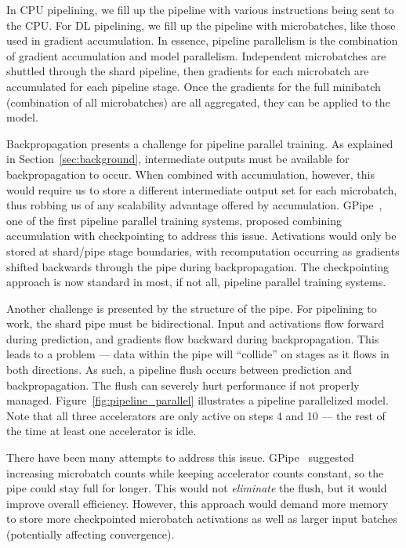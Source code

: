 In CPU pipelining, we fill up the pipeline with various instructions being sent to the CPU. For DL pipelining, we fill up the pipeline with microbatches, like those used in gradient accumulation. In essence, pipeline parallelism is the combination of gradient accumulation and model parallelism. Independent microbatches are shuttled through the shard pipeline, then gradients for each microbatch are accumulated for each pipeline stage. Once the gradients for the full minibatch (combination of all microbatches) are all aggregated, they can be applied to the model.

Backpropagation presents a challenge for pipeline parallel training. As explained in Section~\ref{sec:background}, intermediate outputs must be available for backpropagation to occur. When combined with accumulation, however, this would require us to store a different intermediate output set for each microbatch, thus robbing us of any scalability advantage offered by accumulation. GPipe~\cite{gpipe2019}, one of the first pipeline parallel training systems, proposed combining accumulation with checkpointing to address this issue. Activations would only be stored at shard/pipe stage boundaries, with recomputation occurring as gradients shifted backwards through the pipe during backpropagation. The checkpointing approach is now standard in most, if not all, pipeline parallel training systems.

Another challenge is presented by the structure of the pipe. For pipelining to work, the shard pipe must be bidirectional. Input and activations flow forward during prediction, and gradients flow backward during backpropagation. This leads to a problem --- data within the pipe will ``collide'' on stages as it flows in both directions. As such, a pipeline flush occurs between prediction and backpropagation. The flush can severely hurt performance if not properly managed. Figure~\ref{fig:pipeline_parallel} illustrates a pipeline parallelized model. Note that all three accelerators are only active on steps 4 and 10 --- the rest of the time at least one accelerator is idle.

There have been many attempts to address this issue. GPipe~\cite{gpipe2019} suggested increasing microbatch counts while keeping accelerator counts constant, so the pipe could stay full for longer. This would not \textit{eliminate} the flush, but it would improve overall efficiency. However, this approach would demand more memory to store more checkpointed microbatch activations as well as larger input batches (potentially affecting convergence).

